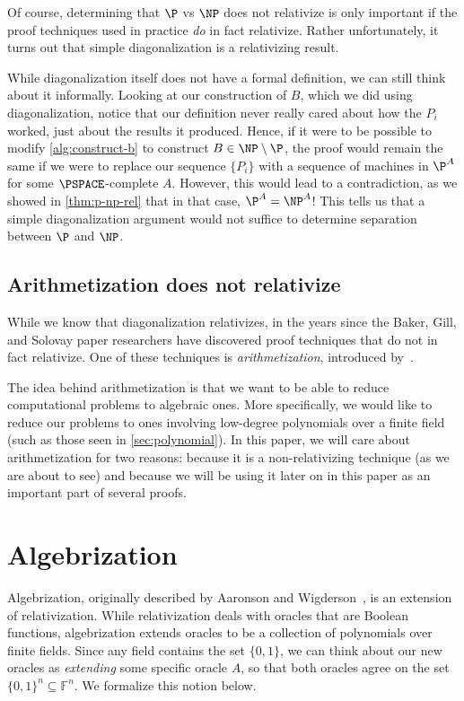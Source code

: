 \documentclass[english,12pt]{reedthesis}
\theoremstyle{plain}
\theoremstyle{definition}
\theoremstyle{remark}
\begin{document}
Of course, determining that $\P$ vs $\NP$ does not relativize is only important
if the proof techniques used in practice \emph{do} in fact relativize. Rather
unfortunately, it turns out that simple diagonalization is a relativizing
result.

While diagonalization itself does not have a formal definition, we can still
think about it informally. Looking at our construction of $B$, which we did
using diagonalization, notice that our definition never really cared about how
the $P_{i}$ worked, just about the results it produced. Hence, if it were to be
possible to modify \cref{alg:construct-b} to construct $B \in \NP \setminus \P$, the proof
would remain the same if we were to replace our sequence $\{P_{i}\}$ with a
sequence of machines in $\P^{A}$ for some $\PSPACE$-complete $A$. However, this
would lead to a contradiction, as we showed in \cref{thm:p-np-rel} that in that
case, $\P^{A} = \NP^{A}$! This tells us that a simple diagonalization argument
would not suffice to determine separation between $\P$ and $\NP$.

\section{Arithmetization does not relativize}\label{sec:arith-non-rel}

While we know that diagonalization relativizes, in the years since the Baker,
Gill, and Solovay paper researchers have discovered proof techniques that do not
in fact relativize. One of these techniques is
\emph{arithmetization}, introduced by~\cite{BF91}.

The idea behind arithmetization is that we want to be able to reduce
computational problems to algebraic ones. More specifically, we would like to
reduce our problems to ones involving low-degree polynomials over a finite field
(such as those seen in \cref{sec:polynomial}). In this paper, we will care about
arithmetization for two reasons: because it is a non-relativizing technique (as
we are about to see) and because we will be using it later on in this paper as
an important part of several proofs. %

\chapter{Algebrization}\label{chap:algebrization}

Algebrization, originally described by Aaronson and Wigderson~\cite{AW09}, is an
extension of relativization. While relativization deals with oracles that are
Boolean functions, algebrization extends oracles to be a collection of
polynomials over finite fields. Since any field contains the set $\{0, 1\}$, we
can think about our new oracles as \emph{extending} some specific oracle $A$, so
that both oracles agree on the set $\{0, 1\}^{n} \subseteq \mathbb{F}^{n}$. We formalize
this notion below.
\end{document}
